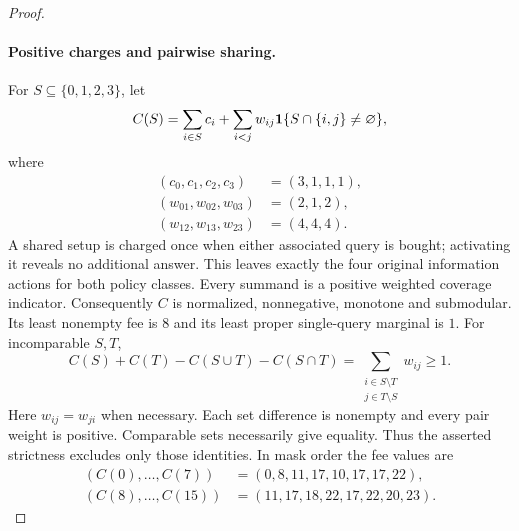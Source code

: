 \begin{proof}
\paragraph*{Positive charges and pairwise sharing.}
For $S\subseteq\{0,1,2,3\}$, let
\begin{equation}\label{eq:pairwise-coverage-C}
 C(S)=\sum_{i\in S}c_i+
       \sum_{i<j}w_{ij}{\bf1}\{S\cap\{i,j\}\ne\varnothing\},
\end{equation}
where
\begin{align*}
 (c_0,c_1,c_2,c_3)&=(3,1,1,1),\\
 (w_{01},w_{02},w_{03})&=(2,1,2),\\
 (w_{12},w_{13},w_{23})&=(4,4,4).
\end{align*}
A shared setup is charged once when either associated query is bought;
activating it reveals no additional answer. This leaves exactly the four
original information actions for both policy classes. Every summand is
a positive weighted coverage indicator. Consequently $C$ is normalized,
nonnegative, monotone and submodular. Its least nonempty fee is $8$ and
its least proper single-query marginal is $1$. For incomparable $S,T$,
\begin{equation}\label{eq:coverage-strict-slack}
 C(S)+C(T)-C(S\cup T)-C(S\cap T)
 =\sum_{\substack{i\in S\setminus T\\j\in T\setminus S}}w_{ij}\geq1.
\end{equation}
Here $w_{ij}=w_{ji}$ when necessary. Each set difference is nonempty
and every pair weight is positive. Comparable sets necessarily give
equality. Thus the asserted strictness excludes only those identities.
In mask order the fee values are
\begin{align*}
 (C(0),\ldots,C(7))&=(0,8,11,17,10,17,17,22),\\
 (C(8),\ldots,C(15))&=(11,17,18,22,17,22,20,23).
\end{align*}


\end{proof}

